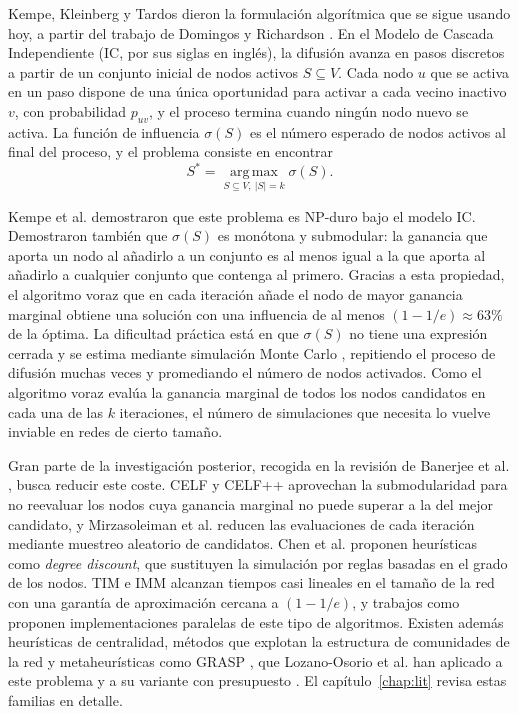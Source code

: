 \documentclass[12pt,twoside,titlepage]{report}
\begin{document}
Kempe, Kleinberg y Tardos \cite{kempe2003maximizing} dieron la formulación algorítmica que se sigue usando hoy, a partir del trabajo de Domingos y Richardson \cite{domingos2001mining}.
En el Modelo de Cascada Independiente (IC, por sus siglas en inglés), la difusión avanza en pasos discretos a partir de un conjunto inicial de nodos activos $S \subseteq V$.
Cada nodo $u$ que se activa en un paso dispone de una única oportunidad para activar a cada vecino inactivo $v$, con probabilidad $p_{uv}$, y el proceso termina cuando ningún nodo nuevo se activa.
La función de influencia $\sigma(S)$ es el número esperado de nodos activos al final del proceso, y el problema consiste en encontrar
\begin{equation}
S^{*} = \operatorname*{arg\,max}_{S \subseteq V,\ |S| = k} \sigma(S).
\end{equation}

Kempe et al. demostraron que este problema es NP-duro bajo el modelo IC.
Demostraron también que $\sigma(S)$ es monótona y submodular: la ganancia que aporta un nodo al añadirlo a un conjunto es al menos igual a la que aporta al añadirlo a cualquier conjunto que contenga al primero.
Gracias a esta propiedad, el algoritmo voraz que en cada iteración añade el nodo de mayor ganancia marginal obtiene una solución con una influencia de al menos $(1 - 1/e) \approx 63\%$ de la óptima.
La dificultad práctica está en que $\sigma(S)$ no tiene una expresión cerrada y se estima mediante simulación Monte Carlo \cite{metropolis1949monte, kalos2008monte}, repitiendo el proceso de difusión muchas veces y promediando el número de nodos activados.
Como el algoritmo voraz evalúa la ganancia marginal de todos los nodos candidatos en cada una de las $k$ iteraciones, el número de simulaciones que necesita lo vuelve inviable en redes de cierto tamaño.

Gran parte de la investigación posterior, recogida en la revisión de Banerjee et al. \cite{banerjee2020survey}, busca reducir este coste.
CELF \cite{leskovec2007cost} y CELF++ \cite{goyal2011celf++} aprovechan la submodularidad para no reevaluar los nodos cuya ganancia marginal no puede superar a la del mejor candidato, y Mirzasoleiman et al. \cite{mirzasoleiman2015lazier} reducen las evaluaciones de cada iteración mediante muestreo aleatorio de candidatos.
Chen et al. \cite{chen2009efficient} proponen heurísticas como \textit{degree discount}, que sustituyen la simulación por reglas basadas en el grado de los nodos.
TIM \cite{tang2014influence} e IMM \cite{tang2015influence} alcanzan tiempos casi lineales en el tamaño de la red con una garantía de aproximación cercana a $(1 - 1/e)$, y trabajos como \cite{minutoli2019fast, wang2024fast} proponen implementaciones paralelas de este tipo de algoritmos.
Existen además heurísticas de centralidad, métodos que explotan la estructura de comunidades de la red y metaheurísticas como GRASP \cite{resende2013grasp}, que Lozano-Osorio et al. han aplicado a este problema y a su variante con presupuesto \cite{LozanoOsorio2021, lozano2024efficient}.
El capítulo~\ref{chap:lit} revisa estas familias en detalle.
\end{document}
